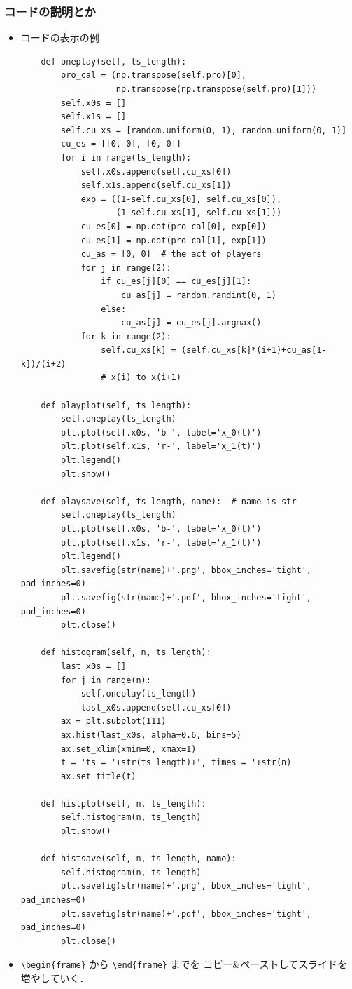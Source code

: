 \documentclass[dvipdfmx,fleqn]{beamer}
\begin{document}
\begin{frame}[containsverbatim]%
\frametitle{コードの説明とか}
\begin{itemize}\setlength{\parskip}{0.5em}
\item
コードの表示の例
\scriptsize
\begin{verbatim}
    def oneplay(self, ts_length):
        pro_cal = (np.transpose(self.pro)[0],
                   np.transpose(np.transpose(self.pro)[1]))
        self.x0s = []
        self.x1s = []
        self.cu_xs = [random.uniform(0, 1), random.uniform(0, 1)]
        cu_es = [[0, 0], [0, 0]]
        for i in range(ts_length):
            self.x0s.append(self.cu_xs[0])
            self.x1s.append(self.cu_xs[1])
            exp = ((1-self.cu_xs[0], self.cu_xs[0]),
                   (1-self.cu_xs[1], self.cu_xs[1]))
            cu_es[0] = np.dot(pro_cal[0], exp[0])
            cu_es[1] = np.dot(pro_cal[1], exp[1])
            cu_as = [0, 0]  # the act of players
            for j in range(2):
                if cu_es[j][0] == cu_es[j][1]:
                    cu_as[j] = random.randint(0, 1)
                else:
                    cu_as[j] = cu_es[j].argmax()
            for k in range(2):
                self.cu_xs[k] = (self.cu_xs[k]*(i+1)+cu_as[1-k])/(i+2)
                # x(i) to x(i+1)

    def playplot(self, ts_length):
        self.oneplay(ts_length)
        plt.plot(self.x0s, 'b-', label='x_0(t)')
        plt.plot(self.x1s, 'r-', label='x_1(t)')
        plt.legend()
        plt.show()

    def playsave(self, ts_length, name):  # name is str
        self.oneplay(ts_length)
        plt.plot(self.x0s, 'b-', label='x_0(t)')
        plt.plot(self.x1s, 'r-', label='x_1(t)')
        plt.legend()
        plt.savefig(str(name)+'.png', bbox_inches='tight', pad_inches=0)
        plt.savefig(str(name)+'.pdf', bbox_inches='tight', pad_inches=0)
        plt.close()

    def histogram(self, n, ts_length):
        last_x0s = []
        for j in range(n):
            self.oneplay(ts_length)
            last_x0s.append(self.cu_xs[0])
        ax = plt.subplot(111)
        ax.hist(last_x0s, alpha=0.6, bins=5)
        ax.set_xlim(xmin=0, xmax=1)
        t = 'ts = '+str(ts_length)+', times = '+str(n)
        ax.set_title(t)

    def histplot(self, n, ts_length):
        self.histogram(n, ts_length)
        plt.show()

    def histsave(self, n, ts_length, name):
        self.histogram(n, ts_length)
        plt.savefig(str(name)+'.png', bbox_inches='tight', pad_inches=0)
        plt.savefig(str(name)+'.pdf', bbox_inches='tight', pad_inches=0)
        plt.close()

\end{verbatim}

\item
\verb|\begin{frame}| から \verb|\end{frame}| までを
コピー\&ペーストしてスライドを増やしていく．
\end{itemize}
\end{frame}
\end{document}
